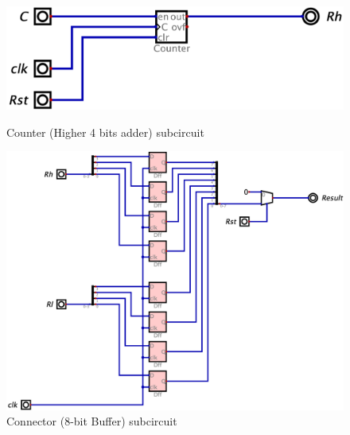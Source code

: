 \documentclass[11pt]{article}
\begin{document}
\begin{appendix}
\begin{figure}[h!]
	\centering
	\begin{minipage}{0.45\textwidth}
		\centering
		\includegraphics[width=\textwidth]{RhCount.png}
		\caption{Counter (Higher 4 bits adder) subcircuit}
		\label{fig:RhCount}
	\end{minipage}
	\hfill
	\begin{minipage}{0.45\textwidth}
		\centering
		\includegraphics[width=\textwidth]{buffer8bit.png}
		\caption{Connector (8-bit Buffer) subcircuit}
		\label{fig:buffer8bit}
	\end{minipage}
\end{figure}


\end{appendix}
\end{document}
